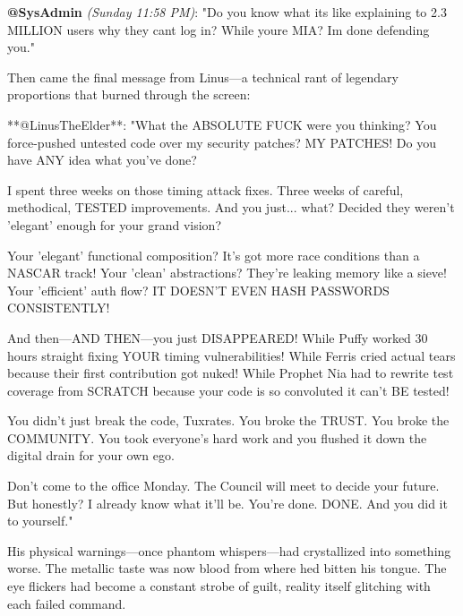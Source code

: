 \textbf{@SysAdmin} \emph{(Sunday 11:58 PM)}: "Do you know what it\textquotesingle s like explaining to 2.3 MILLION users why they can\textquotesingle t log in? While you\textquotesingle re MIA? I\textquotesingle m done defending you."

Then came the final message from Linus---a technical rant of legendary proportions that burned through the screen:

\begin{codeblock}
**@LinusTheElder**: "What the ABSOLUTE FUCK were you thinking? You force-pushed untested code over my security patches? MY PATCHES! Do you have ANY idea what you've done?

I spent three weeks on those timing attack fixes. Three weeks of careful, methodical, TESTED improvements. And you just... what? Decided they weren't 'elegant' enough for your grand vision?

Your 'elegant' functional composition? It's got more race conditions than a NASCAR track! Your 'clean' abstractions? They're leaking memory like a sieve! Your 'efficient' auth flow? IT DOESN'T EVEN HASH PASSWORDS CONSISTENTLY!

And then—AND THEN—you just DISAPPEARED! While Puffy worked 30 hours straight fixing YOUR timing vulnerabilities! While Ferris cried actual tears because their first contribution got nuked! While Prophet Nia had to rewrite test coverage from SCRATCH because your code is so convoluted it can't BE tested!

You didn't just break the code, Tuxrates. You broke the TRUST. You broke the COMMUNITY. You took everyone's hard work and you flushed it down the digital drain for your own ego.

Don't come to the office Monday. The Council will meet to decide your future. But honestly? I already know what it'll be. You're done. DONE. And you did it to yourself."
\end{codeblock}

His physical warnings---once phantom whispers---had crystallized into something worse. The metallic taste was now blood from where he\textquotesingle d bitten his tongue. The eye flickers had become a constant strobe of guilt, reality itself glitching with each failed command.


